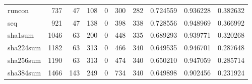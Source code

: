 \begin{longtable}{lrrrrrrrrr}
runcon    &                                                737 &                                                 47 &                                                108 &                                                  0 &                                                300 &                                                282 &                                           0.724559 &                               0.936228 &                             0.382632 \\
seq       &                                                921 &                                                 47 &                                                138 &                                                  0 &                                                398 &                                                338 &                                           0.728556 &                               0.948969 &                             0.366992 \\
sha1sum   &                                               1046 &                                                 63 &                                                200 &                                                  0 &                                                448 &                                                335 &                                           0.689293 &                               0.939771 &                             0.320268 \\
sha224sum &                                               1182 &                                                 63 &                                                313 &                                                  0 &                                                466 &                                                340 &                                           0.649535 &                               0.946701 &                             0.287648 \\
sha256sum &                                               1190 &                                                 63 &                                                313 &                                                  0 &                                                474 &                                                340 &                                           0.650210 &                               0.947059 &                             0.285714 \\
sha384sum &                                               1466 &                                                143 &                                                249 &                                                  0 &                                                734 &                                                340 &                                           0.649898 &                               0.902456 &                             0.231924 \\

\end{longtable}
